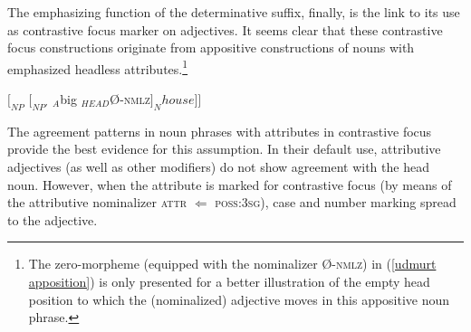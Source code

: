 The emphasizing function of the determinative suffix, finally, is the link to its use as contrastive focus marker on adjectives. It seems clear that these contrastive focus constructions originate from appositive constructions of nouns with emphasized headless attributes.\footnote{The zero-morpheme (equipped with the nominalizer Ø-\textsc{nmlz}) in (\ref{udmurt apposition}) is only presented for a better illustration of the empty head position to which the (nominalized) adjective moves in this appositive noun phrase.}
\begin{exe} \label{udmurt apposition}
\ex $[_{NP}$ $[_{NP'}$ $_{A}$big $_{HEAD}$Ø-\textsc{nmlz}$] _{N}house]]$
\end{exe}
The agreement patterns in noun phrases with attributes in contrastive focus provide the best evidence for this assumption. In their default use, attributive adjectives (as well as other modifiers) do not show agreement with the head noun. However, when the attribute is marked for contrastive focus (by means of the attributive nominalizer \textsc{attr} $\Leftarrow$ \textsc{poss:3sg}), case and number marking spread to the adjective.
